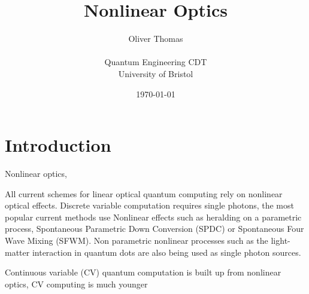 \documentclass[12pt]{article}
\begin{document}

\title{Nonlinear Optics}
    \author{Oliver Thomas \\[0.5em] \\ Quantum Engineering CDT \\ University of Bristol}
    \date{\today}
    \maketitle

    \section{Introduction}

Nonlinear optics,


All current schemes for linear optical quantum computing rely on nonlinear optical effects. Discrete variable computation requires single photons, the most popular current methods use Nonlinear effects such as heralding on a parametric process, Spontaneous Parametric Down Conversion (SPDC) or Spontaneous Four Wave Mixing (SFWM). Non parametric nonlinear processes such as the light-matter interaction in quantum dots are also being used as single photon sources. 

Continuous variable (CV) quantum computation is built up from nonlinear optics, CV computing is much younger   






\end{document}
